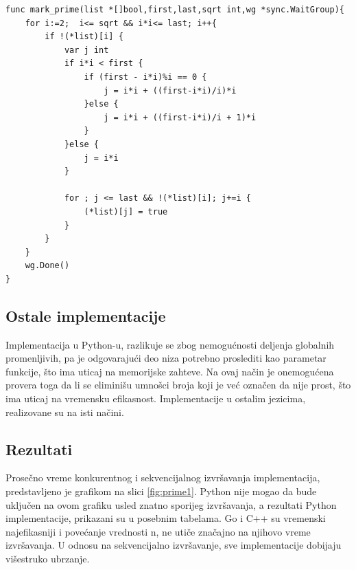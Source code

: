 \documentclass[12pt,oneside]{memoir}
\begin{document}
\begin{center}
\begin{lstlisting}[caption=Implementacija konkurentne funkcije za označavanje prostih brojeva u jeziku Go,label={lst:prime2}, backgroundcolor=\color{background}]
func mark_prime(list *[]bool,first,last,sqrt int,wg *sync.WaitGroup){
	for i:=2;  i<= sqrt && i*i<= last; i++{
		if !(*list)[i] {
			var j int
			if i*i < first {
				if (first - i*i)%i == 0 {
					j = i*i + ((first-i*i)/i)*i
				}else {
					j = i*i + ((first-i*i)/i + 1)*i
				}
			}else {
				j = i*i
			}
		
			for ; j <= last && !(*list)[i]; j+=i {
				(*list)[j] = true
			}
		}
	}
	wg.Done()
}
\end{lstlisting}
\end{center}

\subsection{Ostale implementacije}
Implementacija u Python-u, razlikuje se zbog nemogućnosti deljenja globalnih promenljivih, pa je odgovarajući deo niza potrebno proslediti kao parametar funkcije, što ima uticaj na memorijske zahteve. Na ovaj način je onemogućena provera toga da li se eliminišu umnošci broja koji je već označen da nije prost, što ima uticaj na vremensku efikasnost. Implementacije u ostalim jezicima, realizovane su na isti načini.

\subsection{Rezultati}

Prosečno vreme konkurentnog i sekvencijalnog izvršavanja implementacija, predstavljeno je grafikom na slici \ref{fig:prime1}. Python nije mogao da bude uključen na ovom grafiku usled znatno sporijeg izvršavanja, a rezultati Python implementacije, prikazani su u posebnim tabelama. Go i C++ su vremenski najefikasniji i povećanje vrednosti n, ne utiče značajno na njihovo vreme izvršavanja. U odnosu na sekvencijalno izvršavanje, sve implementacije dobijaju višestruko ubrzanje. 

\end{document}
